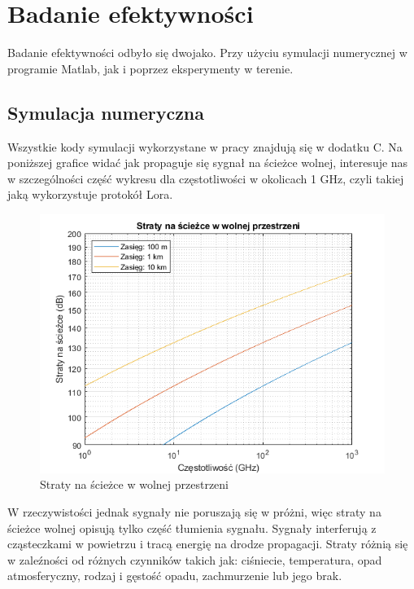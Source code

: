 \chapter{Badanie efektywności}
Badanie efektywności odbyło się dwojako. Przy użyciu symulacji numerycznej w programie Matlab, jak i poprzez eksperymenty w terenie.
\section{Symulacja numeryczna}
Wszystkie kody symulacji wykorzystane w pracy znajdują się w dodatku C.
Na poniższej grafice widać jak propaguje się sygnał na ścieżce wolnej, interesuje nas w szczególności część wykresu dla częstotliwości w okolicach 1 GHz, czyli takiej jaką wykorzystuje protokół Lora.
\begin{figure}[h]
	\label{fig1}
	\includegraphics*{./grafika/num_sim1_straty_na_sciezce.png}
	\caption{Straty na ścieżce w wolnej przestrzeni}
\end{figure}


W rzeczywistości jednak sygnały nie poruszają się w próżni, więc straty na ścieżce wolnej opisują tylko część tłumienia sygnału.
Sygnały interferują z cząsteczkami w powietrzu i tracą energię na drodze propagacji. Straty różnią się w zaleźności od różnych czynników takich jak: ciśniecie, temperatura, opad atmosferyczny, rodzaj i gęstość opadu, zachmurzenie lub jego brak.

